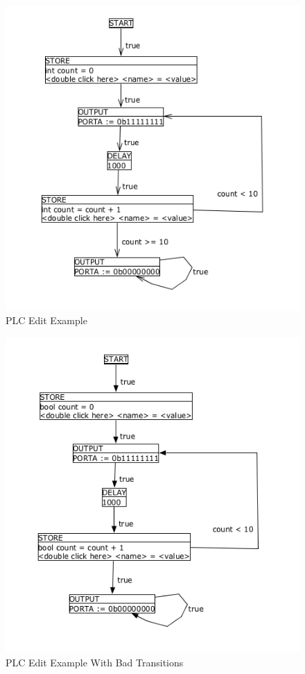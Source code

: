 \begin{figure}[htp]
    \centering
    \includegraphics[width=\imgmedium]{./images/tool_transition_example.png}
    \caption{PLC Edit Example}
    \label{fig:tool_transition_example}
\end{figure}
\begin{figure}[htp]
    \centering
    \includegraphics[width=\imgmedium]{./images/tool_transition_example_bad.png}
    \caption{PLC Edit Example With Bad Transitions}
    \label{fig:tool_transition_example_bad}
\end{figure}


